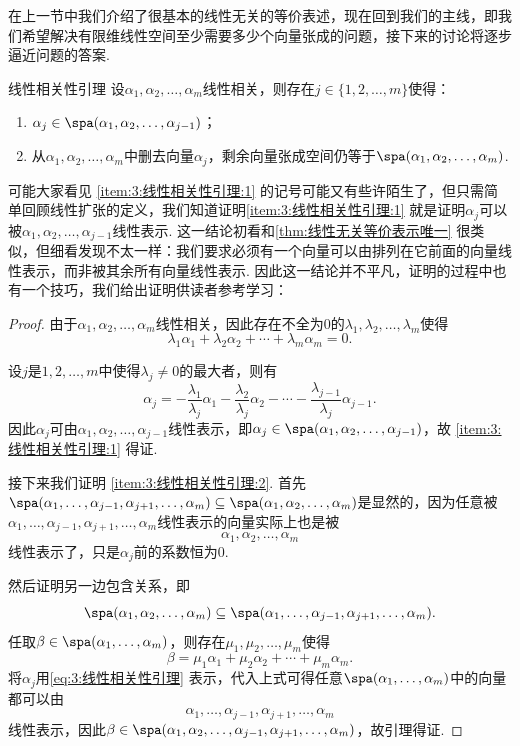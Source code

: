 在上一节中我们介绍了很基本的线性无关的等价表述，现在回到我们的主线，即我们希望解决有限维线性空间至少需要多少个向量张成的问题，接下来的讨论将逐步逼近问题的答案.
\begin{lemma}{}{线性相关性引理}
    设$\alpha_1,\alpha_2,\ldots,\alpha_m$线性相关，则存在$j\in\{1,2,\ldots,m\}$使得：
    \begin{enumerate}
        \item \label{item:3:线性相关性引理:1}
              $\alpha_j \in \spa(\alpha_1,\alpha_2,\ldots,\alpha_{j-1})$；

        \item \label{item:3:线性相关性引理:2}
              从$\alpha_1,\alpha_2,\ldots,\alpha_m$中删去向量$\alpha_j$，剩余向量张成空间仍等于$\spa(\alpha_1,\alpha_2,\ldots,\alpha_m)$.
    \end{enumerate}
\end{lemma}
可能大家看见 \ref*{item:3:线性相关性引理:1} 的记号可能又有些许陌生了，但只需简单回顾线性扩张的定义，我们知道证明\ref*{item:3:线性相关性引理:1} 就是证明$\alpha_j$可以被$\alpha_1,\alpha_2,\ldots,\alpha_{j-1}$线性表示. 这一结论初看和\autoref{thm:线性无关等价表示唯一} 很类似，但细看发现不太一样：我们要求必须有一个向量可以由排列在它前面的向量线性表示，而非被其余所有向量线性表示. 因此这一结论并不平凡，证明的过程中也有一个技巧，我们给出证明供读者参考学习：

\begin{proof}
    由于$\alpha_1,\alpha_2,\ldots,\alpha_m$线性相关，因此存在不全为0的$\lambda_1,\lambda_2,\ldots,\lambda_m$使得
    \[\lambda_1\alpha_1+\lambda_2\alpha_2+\cdots+\lambda_m\alpha_m=0.\]

    设$j$是$1,2,\ldots,m$中使得$\lambda_j\neq 0$的最大者，则有
    \begin{equation}\label{eq:3:线性相关性引理}
        \alpha_j=-\frac{\lambda_1}{\lambda_j}\alpha_1-\frac{\lambda_2}{\lambda_j}\alpha_2-\cdots-\frac{\lambda_{j-1}}{\lambda_j}\alpha_{j-1}.
    \end{equation}
    因此$\alpha_j$可由$\alpha_1,\alpha_2,\ldots,\alpha_{j-1}$线性表示，即$\alpha_j\in\spa(\alpha_1,\alpha_2,\ldots,\alpha_{j-1})$，故 \ref*{item:3:线性相关性引理:1} 得证.

    接下来我们证明 \ref*{item:3:线性相关性引理:2}. 首先$\spa(\alpha_1,\ldots,\alpha_{j-1},\alpha_{j+1},\ldots,\alpha_m)\subseteq\spa(\alpha_1,\alpha_2,\ldots,\alpha_m)$是显然的，因为任意被$\alpha_1,\ldots,\alpha_{j-1},\alpha_{j+1},\ldots,\alpha_m$线性表示的向量实际上也是被
    \[\alpha_1,\alpha_2,\ldots,\alpha_m\]
    线性表示了，只是$\alpha_j$前的系数恒为0.

    然后证明另一边包含关系，即
    \[\spa(\alpha_1,\alpha_2,\ldots,\alpha_m)\subseteq\spa(\alpha_1,\ldots,\alpha_{j-1},\alpha_{j+1},\ldots,\alpha_m).\]
    任取$\beta\in\spa(\alpha_1,\ldots,\alpha_m)$，则存在$\mu_1,\mu_2,\ldots,\mu_m$使得
    \[\beta=\mu_1\alpha_1+\mu_2\alpha_2+\cdots+\mu_m\alpha_m.\]
    将$\alpha_j$用\autoref{eq:3:线性相关性引理} 表示，代入上式可得任意$\spa(\alpha_1,\ldots,\alpha_m)$中的向量都可以由\[\alpha_1,\ldots,\alpha_{j-1},\alpha_{j+1},\ldots,\alpha_m\]线性表示，因此$\beta\in\spa(\alpha_1,\alpha_2,\ldots,\alpha_{j-1},\alpha_{j+1},\ldots,\alpha_m)$，故引理得证.
\end{proof}

